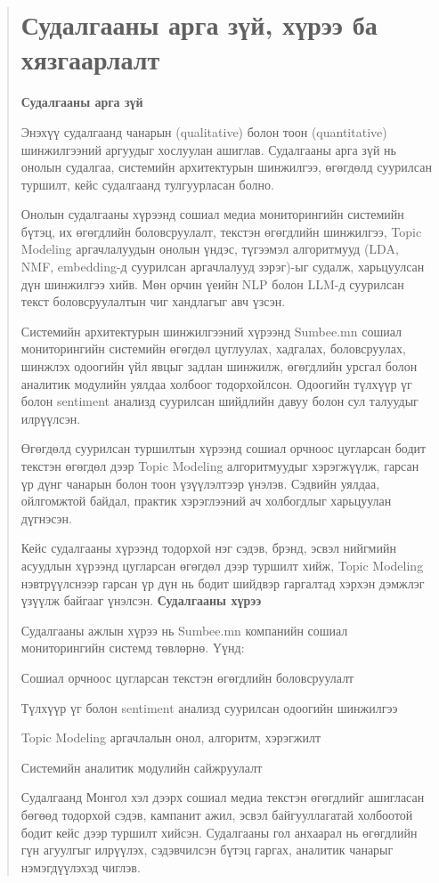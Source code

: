 \begin{abstract}
\section{Судалгааны арга зүй, хүрээ ба хязгаарлалт}
\textbf{Судалгааны арга зүй}

Энэхүү судалгаанд чанарын (qualitative) болон тоон (quantitative) шинжилгээний аргуудыг хослуулан ашиглав. Судалгааны арга зүй нь онолын судалгаа, системийн архитектурын шинжилгээ, өгөгдөлд суурилсан туршилт, кейс судалгаанд тулгуурласан болно.

Онолын судалгааны хүрээнд сошиал медиа мониторингийн системийн бүтэц, их өгөгдлийн боловсруулалт, текстэн өгөгдлийн шинжилгээ, Topic Modeling аргачлалуудын онолын үндэс, түгээмэл алгоритмууд (LDA, NMF, embedding-д суурилсан аргачлалууд зэрэг)-ыг судалж, харьцуулсан дүн шинжилгээ хийв. Мөн орчин үеийн NLP болон LLM-д суурилсан текст боловсруулалтын чиг хандлагыг авч үзсэн.

Системийн архитектурын шинжилгээний хүрээнд Sumbee.mn сошиал мониторингийн системийн өгөгдөл цуглуулах, хадгалах, боловсруулах, шинжлэх одоогийн үйл явцыг задлан шинжилж, өгөгдлийн урсгал болон аналитик модулийн уялдаа холбоог тодорхойлсон. Одоогийн түлхүүр үг болон sentiment анализд суурилсан шийдлийн давуу болон сул талуудыг илрүүлсэн.

Өгөгдөлд суурилсан туршилтын хүрээнд сошиал орчноос цугларсан бодит текстэн өгөгдөл дээр Topic Modeling алгоритмуудыг хэрэгжүүлж, гарсан үр дүнг чанарын болон тоон үзүүлэлтээр үнэлэв. Сэдвийн уялдаа, ойлгомжтой байдал, практик хэрэглээний ач холбогдлыг харьцуулан дүгнэсэн.

Кейс судалгааны хүрээнд тодорхой нэг сэдэв, брэнд, эсвэл нийгмийн асуудлын хүрээнд цугларсан өгөгдөл дээр туршилт хийж, Topic Modeling нэвтрүүлснээр гарсан үр дүн нь бодит шийдвэр гаргалтад хэрхэн дэмжлэг үзүүлж байгааг үнэлсэн.
\textbf{Судалгааны хүрээ}

Судалгааны ажлын хүрээ нь Sumbee.mn компанийн сошиал мониторингийн системд төвлөрнө. Үүнд:

Сошиал орчноос цугларсан текстэн өгөгдлийн боловсруулалт

Түлхүүр үг болон sentiment анализд суурилсан одоогийн шинжилгээ

Topic Modeling аргачлалын онол, алгоритм, хэрэгжилт

Системийн аналитик модулийн сайжруулалт

Судалгаанд Монгол хэл дээрх сошиал медиа текстэн өгөгдлийг ашигласан бөгөөд тодорхой сэдэв, кампанит ажил, эсвэл байгууллагатай холбоотой бодит кейс дээр туршилт хийсэн. Судалгааны гол анхаарал нь өгөгдлийн гүн агуулгыг илрүүлэх, сэдэвчилсэн бүтэц гаргах, аналитик чанарыг нэмэгдүүлэхэд чиглэв.


\end{abstract}
